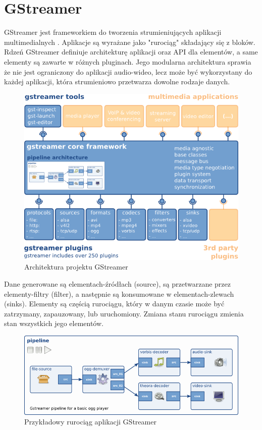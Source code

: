 \section{GStreamer}

GStreamer jest frameworkiem do tworzenia strumieniujących aplikacji multimedialnych
\cite{gstreamer}. Aplikacje są wyrażane jako "rurociąg" składający się z bloków. Rdzeń GStreamer
definiuje architekturę aplikacji oraz API dla elementów, a same elementy są zawarte w różnych
pluginach. Jego modularna architektura sprawia że nie jest ograniczony do aplikacji audio-wideo,
lecz może być wykorzystany do każdej aplikacji, która strumieniowo przetwarza dowolne rodzaje
danych.

\begin{figure}[H]
    \centering
    \includegraphics[width=.5\textwidth]{img/technologie/gstreamer-overview}
    \caption{Architektura projektu GStreamer}
\end{figure}

Dane generowane są elementach-źródłach (source), są przetwarzane przez elementy-filtry (filter), a
następnie są konsumowane w elementach-zlewach (sinks). Elementy są częścią rurociągu, który w danym
czasie może być zatrzymany, zapauzowany, lub uruchomiony. Zmiana stanu rurociągu zmienia stan
wszystkich jego elementów.

\begin{figure}[H]
    \centering
    \includegraphics[width=.7\textwidth]{img/technologie/simple-player}
    \caption{Przykładowy rurociąg aplikacji GStreamer}
    \label{fig:gstreamer_example_pipeline}
\end{figure}

